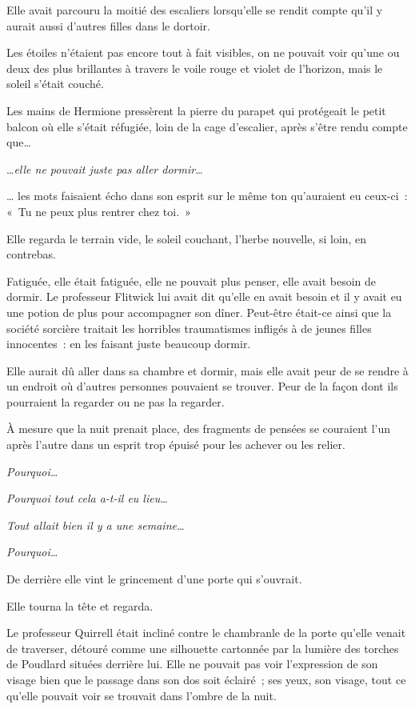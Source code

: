 Elle avait parcouru la moitié des escaliers lorsqu'elle se rendit compte qu'il y aurait aussi d'autres filles dans le dortoir.

\later

Les étoiles n'étaient pas encore tout à fait visibles, on ne pouvait voir qu'une ou deux des plus brillantes à travers le voile rouge et violet de l'horizon, mais le soleil s'était couché.

Les mains de Hermione pressèrent la pierre du parapet qui protégeait le petit balcon où elle s'était réfugiée, loin de la cage d'escalier, après s'être rendu compte que…

…\emph{elle ne pouvait juste pas aller dormir…}

… les mots faisaient écho dans son esprit sur le même ton qu'auraient eu ceux-ci~: «~Tu ne peux plus rentrer chez toi.~»

Elle regarda le terrain vide, le soleil couchant, l'herbe nouvelle, si loin, en contrebas.

Fatiguée, elle était fatiguée, elle ne pouvait plus penser, elle avait besoin de dormir. Le professeur Flitwick lui avait dit qu'elle en avait besoin et il y avait eu une potion de plus pour accompagner son dîner. Peut-être était-ce ainsi que la société sorcière traitait les horribles traumatismes infligés à de jeunes filles innocentes~: en les faisant juste beaucoup dormir.

Elle aurait dû aller dans sa chambre et dormir, mais elle avait peur de se rendre à un endroit où d'autres personnes pouvaient se trouver. Peur de la façon dont ils pourraient la regarder ou ne pas la regarder.

À mesure que la nuit prenait place, des fragments de pensées se couraient l'un après l'autre dans un esprit trop épuisé pour les achever ou les relier.

\emph{Pourquoi…}

\emph{Pourquoi tout cela a-t-il eu lieu…}

\emph{Tout allait bien il y a une semaine…}

\emph{Pourquoi…}

De derrière elle vint le grincement d'une porte qui s'ouvrait.

Elle tourna la tête et regarda.

Le professeur Quirrell était incliné contre le chambranle de la porte qu'elle venait de traverser, détouré comme une silhouette cartonnée par la lumière des torches de Poudlard situées derrière lui. Elle ne pouvait pas voir l'expression de son visage bien que le passage dans son dos soit éclairé~; ses yeux, son visage, tout ce qu'elle pouvait voir se trouvait dans l'ombre de la nuit.

